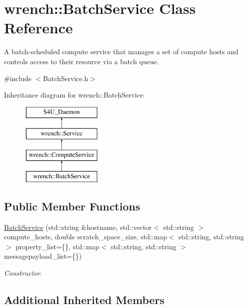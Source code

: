 \hypertarget{classwrench_1_1_batch_service}{}\section{wrench\+:\+:Batch\+Service Class Reference}
\label{classwrench_1_1_batch_service}


A batch-\/scheduled compute service that manages a set of compute hosts and controls access to their resource via a batch queue.  




{\ttfamily \#include $<$Batch\+Service.\+h$>$}

Inheritance diagram for wrench\+:\+:Batch\+Service\+:\begin{figure}[H]
\begin{center}
\leavevmode
\includegraphics[height=4.000000cm]{classwrench_1_1_batch_service}
\end{center}
\end{figure}
\subsection*{Public Member Functions}
\begin{DoxyCompactItemize}
\item 
\hyperlink{classwrench_1_1_batch_service_a2f91405c977001fa52acda0fe849f143}{Batch\+Service} (std\+::string \&hostname, std\+::vector$<$ std\+::string $>$ compute\+\_\+hosts, double scratch\+\_\+space\+\_\+size, std\+::map$<$ std\+::string, std\+::string $>$ property\+\_\+list=\{\}, std\+::map$<$ std\+::string, std\+::string $>$ messagepayload\+\_\+list=\{\})
\begin{DoxyCompactList}\small\item\em Constructor. \end{DoxyCompactList}\end{DoxyCompactItemize}
\subsection*{Additional Inherited Members}


